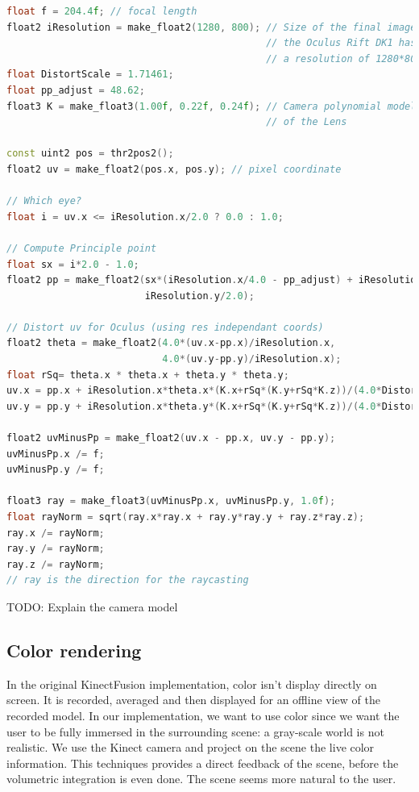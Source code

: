 \documentclass[12pt]{article}
\begin{document}
\begin{lstlisting}[language=C++, caption={C++ code for the Lens distortion}, label={lst:lensray}]
float f = 204.4f; // focal length
float2 iResolution = make_float2(1280, 800); // Size of the final image:
                                             // the Oculus Rift DK1 has
                                             // a resolution of 1280*800
float DistortScale = 1.71461;
float pp_adjust = 48.62;
float3 K = make_float3(1.00f, 0.22f, 0.24f); // Camera polynomial model
                                             // of the Lens

const uint2 pos = thr2pos2();
float2 uv = make_float2(pos.x, pos.y); // pixel coordinate
    
// Which eye?
float i = uv.x <= iResolution.x/2.0 ? 0.0 : 1.0;

// Compute Principle point
float sx = i*2.0 - 1.0;
float2 pp = make_float2(sx*(iResolution.x/4.0 - pp_adjust) + iResolution.x/2.0,
                        iResolution.y/2.0);

// Distort uv for Oculus (using res independant coords)
float2 theta = make_float2(4.0*(uv.x-pp.x)/iResolution.x,
                           4.0*(uv.y-pp.y)/iResolution.x);
float rSq= theta.x * theta.x + theta.y * theta.y;
uv.x = pp.x + iResolution.x*theta.x*(K.x+rSq*(K.y+rSq*K.z))/(4.0*DistortScale);
uv.y = pp.y + iResolution.x*theta.y*(K.x+rSq*(K.y+rSq*K.z))/(4.0*DistortScale);

float2 uvMinusPp = make_float2(uv.x - pp.x, uv.y - pp.y);
uvMinusPp.x /= f;
uvMinusPp.y /= f;

float3 ray = make_float3(uvMinusPp.x, uvMinusPp.y, 1.0f);
float rayNorm = sqrt(ray.x*ray.x + ray.y*ray.y + ray.z*ray.z);
ray.x /= rayNorm;
ray.y /= rayNorm;
ray.z /= rayNorm;
// ray is the direction for the raycasting
\end{lstlisting}

TODO: Explain the camera model

\subsection{Color rendering}
In the original KinectFusion implementation, color isn't display directly on screen. It is recorded, averaged and then displayed for an offline view of the recorded model. In our implementation, we want to use color since we want the user to be fully immersed in the surrounding scene: a gray-scale world is not realistic. We use the Kinect camera and project on the scene the live color information. This techniques provides a direct feedback of the scene, before the volumetric integration is even done. The scene seems more natural to the user.
\end{document}
